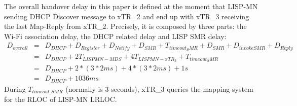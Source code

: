 The overall handover delay in this paper is defined at the moment that LISP-MN sending DHCP Discover message to xTR\_2 and end up with xTR\_3 receiving the last Map-Reply from xTR\_2. Precisely, it is composed by three parts: the Wi-Fi association delay, the DHCP related delay and LISP SMR delay:
\begin{eqnarray}
D_{overall} &=& D_{DHCP} + D_{Register} + D_{Notify} + D_{SMR} + T_{timeout_SMR} + D_{SMR} + D_{invokeSMR} + D_{Reply} \nonumber \\
&=& D_{DHCP} + 2T_{LISPMN-MDS} + 4T_{LISPMN-xTR_3} + T_{timeout_SMR}\nonumber \\
&=& D_{DHCP} + 2* (3*2ms) + 4*(3*2ms) + 1s\nonumber \\
&=& D_{DHCP} + 1036 ms
\end{eqnarray}
During $T_{timeout\_SMR}$ (normally is 3 seconds), xTR\_3 queries the mapping system for the RLOC of LISP-MN LRLOC.

